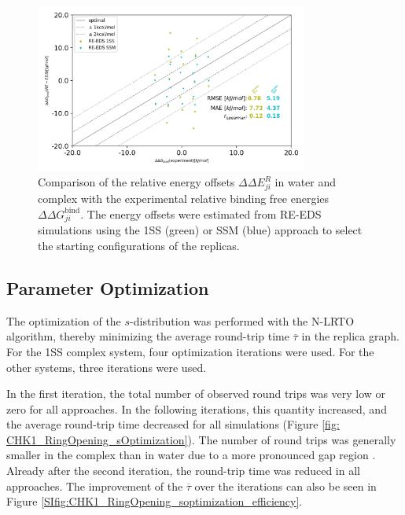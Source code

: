 \begin{figure}[h]
\centering
  \includegraphics[width=0.8\textwidth]{fig/results/ringOpening/paramOptimization/RingClosure_system_Eoff_final_results.png}
\caption{Comparison of the relative energy offsets $\Delta \Delta E^R_{ji}$ in water and complex with the experimental relative binding free energies $\Delta \Delta G^\text{bind}_{ji}$. The energy offsets were estimated from RE-EDS simulations using the 1SS (green) or SSM (blue) approach to select the starting configurations of the replicas.} \label{SIfig:Eoff_experiment_corr_RingOpening}
\end{figure}

\FloatBarrier
\clearpage 

\subsection{Parameter Optimization}
The optimization of the $s$-distribution was performed with the N-LRTO \cite{Sidler2017} algorithm, thereby minimizing the average round-trip time $\overline{\tau}$ in the replica graph. For the 1SS complex system, four optimization iterations were used. For the other systems, three iterations were used. 

In the first iteration, the total number of observed round trips was very low or zero for all approaches. In the following iterations, this quantity increased, and the average round-trip time decreased for all simulations (Figure \ref{fig: CHK1_RingOpening_sOptimization}). The number of round trips was generally smaller in the complex than in water due to a more pronounced gap region \cite{Sidler2017}.
Already after the second iteration, the round-trip time was reduced in all approaches. The improvement of the $\overline{\tau}$ over the iterations can also be seen in Figure \ref{SIfig:CHK1_RingOpening_soptimization_efficiency}.

